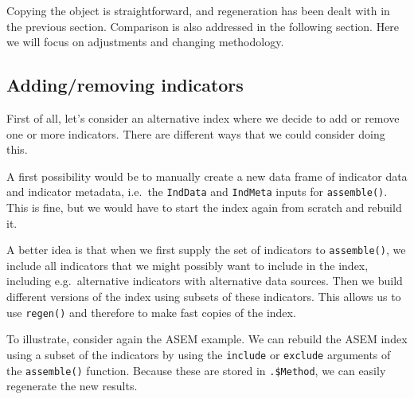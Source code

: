 \documentclass[
]{book}
\newenvironment{Shaded}{\begin{snugshade}}{\end{snugshade}}
\newcommand{\CommentTok}[1]{\textcolor[rgb]{0.56,0.35,0.01}{\textit{#1}}}
\newcommand{\DataTypeTok}[1]{\textcolor[rgb]{0.13,0.29,0.53}{#1}}
\newcommand{\KeywordTok}[1]{\textcolor[rgb]{0.13,0.29,0.53}{\textbf{#1}}}
\newcommand{\NormalTok}[1]{#1}
\newcommand{\OperatorTok}[1]{\textcolor[rgb]{0.81,0.36,0.00}{\textbf{#1}}}
\newcommand{\OtherTok}[1]{\textcolor[rgb]{0.56,0.35,0.01}{#1}}
\newcommand{\StringTok}[1]{\textcolor[rgb]{0.31,0.60,0.02}{#1}}
\begin{document}
Copying the object is straightforward, and regeneration has been dealt with in the previous section. Comparison is also addressed in the following section. Here we will focus on adjustments and changing methodology.

\hypertarget{addingremoving-indicators}{%
\subsection{Adding/removing indicators}\label{addingremoving-indicators}}

First of all, let's consider an alternative index where we decide to add or remove one or more indicators. There are different ways that we could consider doing this.

A first possibility would be to manually create a new data frame of indicator data and indicator metadata, i.e.~the \texttt{IndData} and \texttt{IndMeta} inputs for \texttt{assemble()}. This is fine, but we would have to start the index again from scratch and rebuild it.

A better idea is that when we first supply the set of indicators to \texttt{assemble()}, we include all indicators that we might possibly want to include in the index, including e.g.~alternative indicators with alternative data sources. Then we build different versions of the index using subsets of these indicators. This allows us to use \texttt{regen()} and therefore to make fast copies of the index.

To illustrate, consider again the ASEM example. We can rebuild the ASEM index using a subset of the indicators by using the \texttt{include} or \texttt{exclude} arguments of the \texttt{assemble()} function. Because these are stored in \texttt{.\$Method}, we can easily regenerate the new results.

\begin{Shaded}
\end{Shaded}
\end{document}
